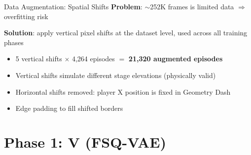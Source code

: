 \documentclass[aspectratio=169]{beamer}
\newcommand{\nshifts}{5}             %
\newcommand{\nbaseepisodes}{4{,}264} %
\newcommand{\naugeps}{21{,}320}      %
\begin{document}
\begin{frame}{Data Augmentation: Spatial Shifts}
  \textbf{Problem}: $\sim$252K frames is limited data $\Rightarrow$ overfitting risk

  \vspace{0.3em}
  \textbf{Solution}: apply vertical pixel shifts at the dataset level, used across all training phases

  \begin{center}
  \end{center}

  \begin{itemize}
    \item \nshifts{} vertical shifts $\times$ \nbaseepisodes{} episodes $=$ \textbf{\naugeps{} augmented episodes}
    \item Vertical shifts simulate different stage elevations (physically valid)
    \item Horizontal shifts removed: player X position is fixed in Geometry Dash
    \item Edge padding to fill shifted borders
  \end{itemize}
\end{frame}

\section{Phase 1: V (FSQ-VAE)}
\end{document}
